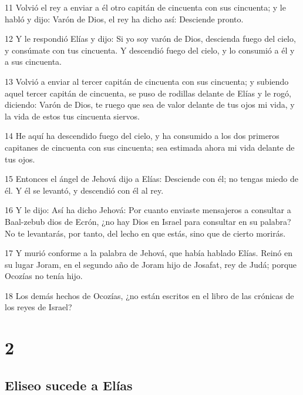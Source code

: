 \par 11 Volvió el rey a enviar a él otro capitán de cincuenta con sus cincuenta; y le habló y dijo: Varón de Dios, el rey ha dicho así: Desciende pronto.
\par 12 Y le respondió Elías y dijo: Si yo soy varón de Dios, descienda fuego del cielo, y consúmate con tus cincuenta. Y descendió fuego del cielo, y lo consumió a él y a sus cincuenta.
\par 13 Volvió a enviar al tercer capitán de cincuenta con sus cincuenta; y subiendo aquel tercer capitán de cincuenta, se puso de rodillas delante de Elías y le rogó, diciendo: Varón de Dios, te ruego que sea de valor delante de tus ojos mi vida, y la vida de estos tus cincuenta siervos.
\par 14 He aquí ha descendido fuego del cielo, y ha consumido a los dos primeros capitanes de cincuenta con sus cincuenta; sea estimada ahora mi vida delante de tus ojos.
\par 15 Entonces el ángel de Jehová dijo a Elías: Desciende con él; no tengas miedo de él. Y él se levantó, y descendió con él al rey.
\par 16 Y le dijo: Así ha dicho Jehová: Por cuanto enviaste mensajeros a consultar a Baal-zebub dios de Ecrón, ¿no hay Dios en Israel para consultar en su palabra? No te levantarás, por tanto, del lecho en que estás, sino que de cierto morirás.
\par 17 Y murió conforme a la palabra de Jehová, que había hablado Elías. Reinó en su lugar Joram, en el segundo año de Joram hijo de Josafat, rey de Judá; porque Ocozías no tenía hijo.
\par 18 Los demás hechos de Ocozías, ¿no están escritos en el libro de las crónicas de los reyes de Israel?

\chapter{2}

\section*{Eliseo sucede a Elías}

